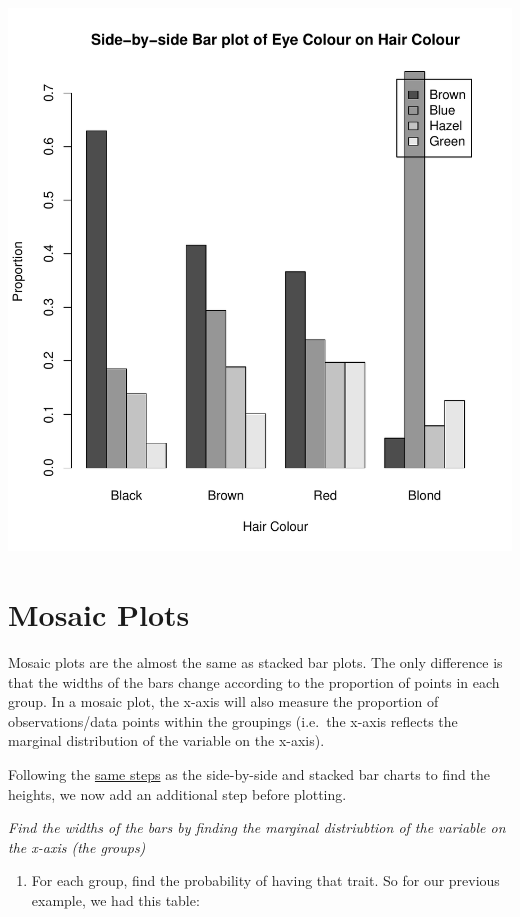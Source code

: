 \documentclass[
]{book}
\providecommand{\tightlist}{%
  \setlength{\itemsep}{0pt}\setlength{\parskip}{0pt}}
\theoremstyle{definition}
\theoremstyle{definition}
\theoremstyle{definition}
\theoremstyle{definition}
\theoremstyle{remark}
\begin{document}
\includegraphics{_main_files/figure-latex/unnamed-chunk-13-1.pdf}

\hypertarget{mosaic-plots}{%
\section{Mosaic Plots}\label{mosaic-plots}}

Mosaic plots are the almost the same as stacked bar plots. The only
difference is that the widths of the bars change according to the
proportion of points in each group. In a mosaic plot, the x-axis will
also measure the proportion of observations/data points within the
groupings (i.e.~the x-axis reflects the marginal distribution of the
variable on the x-axis).

Following the \protect\hyperlink{stacked-bar-plots-and-side-by-side-bar-plots}{same
steps} as the
side-by-side and stacked bar charts to find the heights, we now add an
additional step before plotting.

\emph{Find the widths of the bars by finding the marginal distriubtion of the
variable on the x-axis (the groups)}

\begin{enumerate}
\def\labelenumi{\arabic{enumi}.}
\tightlist
\item
  For each group, find the probability of having that trait. So for
  our previous example, we had this table:
\end{enumerate}
\end{document}
